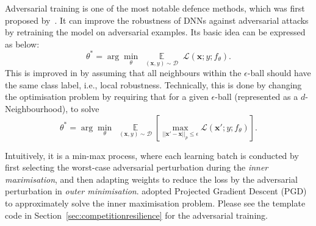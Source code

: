 Adversarial training is one of the most notable defence methods, which was first proposed by~\cite{DBLP:journals/corr/GoodfellowSS14}. It can improve the robustness of DNNs against adversarial attacks by retraining the model on adversarial examples. Its basic idea can be expressed as below:
\begin{equation}
\theta^* = \arg \min_\theta\; \mathop{\mathbb{E}}\limits_{(\mathbf{x},y)\sim \mathcal{D}} \; \mathcal{L}(\mathbf{x}; y; f_\theta).
\end{equation}
This is improved in \cite{madry2017towards} by assuming that all neighbours within the $\epsilon$-ball should have the same class label, i.e., local robustness. Technically, this is done by changing the optimisation problem by requiring that   
%
for a given $\epsilon$-ball (represented as a $d$-Neighbourhood), to solve \begin{equation}
\label{eq_advtrn}
\theta^* = \arg \min_\theta\; \mathop{\mathbb{E}}\limits_{(\mathbf{x},y)\sim \mathcal{D}} \left[ \max_{||\mathbf{x}'-\mathbf{x}||_p\le \epsilon} \mathcal{L}(\mathbf{x}'; y; f_\theta) \right].
\end{equation} 
\iffalse
The general idea is to create and incorporate adversarial examples into the training process. Surely, given there are many different ways of generating adversarial examples and various ways of incorporating them into training, this general idea thus can be implemented in a variety of approaches. 
%
The following is a typical format on how to conduct adversarial training.  
%
\begin{equation}
    \min_{\textbf{W}} \sum_{(\textbf{x},y)\in D} \max_{\textbf{\textdelta} \in \Delta(\textbf{x})} L(f_{\textbf{W}}(\textbf{x}+\textbf{\textdelta}),y)
\end{equation}
\fi
%
Intuitively, it is a min-max process, where each learning batch is conducted by first selecting the worst-case adversarial perturbation during the \emph{inner maximisation}, and then adapting weights to reduce the loss by the adversarial perturbation in \emph{outer minimisation}. \cite{madry2017towards} adopted Projected Gradient Descent (PGD) to approximately solve the inner maximisation problem.
Please see the template code in Section~\ref{sec:competitionresilience} for the adversarial training. 

